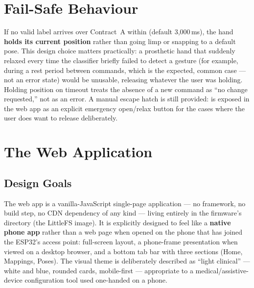 \section{Fail-Safe Behaviour}
\label{sec:app_failsafe}

If no valid label arrives over Contract~A within
 (default 3{,}000\,ms), the hand
\textbf{holds its current position} rather than going limp or
snapping to a default pose. This design choice matters
practically: a prosthetic hand that suddenly relaxed every time the
classifier briefly failed to detect a gesture (for example, during
a rest period between commands, which is the expected, common case
--- not an error state) would be unusable, releasing whatever the
user was holding. Holding position on timeout treats the absence of
a new command as ``no change requested,'' not as an error. A manual
escape hatch is still provided:  is exposed
in the web app as an explicit emergency open/relax button for the
cases where the user does want to release deliberately.

\section{The Web Application}
\label{sec:app_webapp}

\subsection{Design Goals}

The web app is a vanilla-JavaScript single-page application ---
no framework, no build step, no CDN dependency of any kind ---
living entirely in the firmware's  directory (the
LittleFS image). It is explicitly designed to feel like a
\textbf{native phone app} rather than a web page when opened on the
phone that has joined the ESP32's access point: full-screen layout,
a phone-frame presentation when viewed on a desktop browser, and a
bottom tab bar with three sections (Home, Mappings, Poses). The
visual theme is deliberately described as ``light clinical'' ---
white and blue, rounded cards, mobile-first --- appropriate to a
medical/assistive-device configuration tool used one-handed on a
phone.

